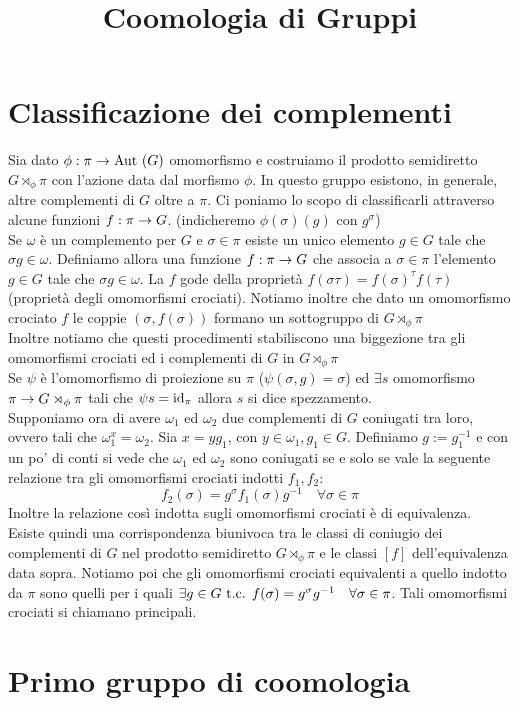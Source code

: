 \documentclass[a4paper,NoNotes,GeneralMath]{stdmdoc}
\newcommand{\Aut}{\text{Aut }}
\begin{document}
	\title{Coomologia di Gruppi}
	
	\section*{Classificazione dei complementi}
	Sia dato $\phi: \pi \rar \Aut(G)$ omomorfismo e costruiamo il prodotto semidiretto $G \rtimes_\phi \pi$ con l'azione data dal morfismo $\phi$. In questo gruppo esistono, in generale, altre complementi di $G$ oltre a $\pi$. Ci poniamo lo scopo di classificarli attraverso alcune funzioni $f: \pi \rightarrow G$. (indicheremo $\phi(\sigma)(g)$ con $g^\sigma$) \\
	
	Se $\omega$ è un complemento per $G$ e $\sigma \in \pi$ esiste un unico elemento $g \in G$ tale che $\sigma g \in \omega$. Definiamo allora una funzione $f: \pi \rightarrow G$ che associa a $\sigma \in \pi$ l'elemento $g \in G$ tale che $\sigma g \in \omega$. La $f$ gode della proprietà $f(\sigma \tau) = f(\sigma)^\tau f(\tau)$ (proprietà degli omomorfismi crociati). Notiamo inoltre che dato un omomorfismo crociato $f$ le coppie $(\sigma, f(\sigma))$ formano un sottogruppo di $G \rtimes_\phi \pi$ \\
	
	Inoltre notiamo che questi procedimenti stabiliscono una biggezione tra gli omomorfismi crociati ed i complementi di $G$ in $G \rtimes_\phi \pi$ \\
	
	Se $\psi$ è l'omomorfismo di proiezione su $\pi$ ($\psi(\sigma, g) = \sigma$) ed $\exists s$ omomorfismo $\pi \rightarrow G \rtimes_\phi \pi$ tali che $\psi s = \mbox{id}_\pi$ allora $s$ si dice spezzamento. \\
	
	Supponiamo ora di avere $\omega_1$ ed $\omega_2$ due complementi di $G$ coniugati tra loro, ovvero tali che $\omega_1^x = \omega_2$. Sia $x = yg_1$, con $y \in \omega_1, g_1 \in G$. Definiamo $g := g_1^{-1}$ e con un po' di conti si vede che $\omega_1$ ed $\omega_2$ sono coniugati se e solo se vale la seguente relazione tra gli omomorfismi crociati indotti $f_1, f_2$: $$ f_2(\sigma) = g^\sigma f_1(\sigma) g^{-1} \quad \forall \sigma \in \pi $$ Inoltre la relazione così indotta sugli omomorfismi crociati è di equivalenza. \\
	
	Esiste quindi una corrispondenza biunivoca tra le classi di coniugio dei complementi di $G$ nel prodotto semidiretto $G \rtimes_\phi \pi$ e le classi $[f]$ dell'equivalenza data sopra. Notiamo poi che gli omomorfismi crociati equivalenti a quello indotto da $\pi$ sono quelli per i quali $\exists g \in G \mbox{ t.c. } f(\sigma) = g^\sigma g^{-1} \quad \forall \sigma \in \pi$. Tali omomorfismi crociati si chiamano principali. \\
	
	\section*{Primo gruppo di coomologia}
	
\end{document}
